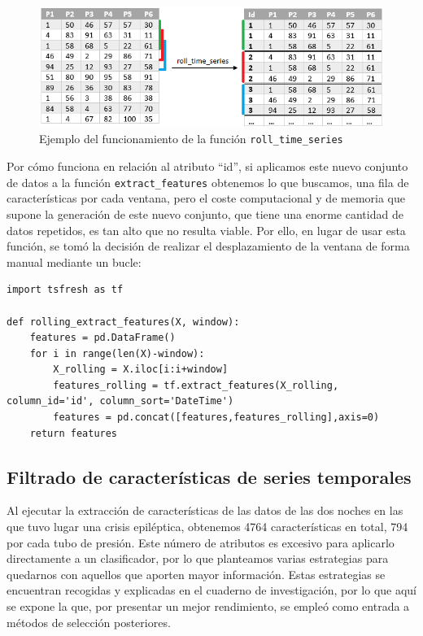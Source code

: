 \begin{figure}[H]
	\centering
	\includegraphics[width=1\textwidth]{../img/rolltimeseries.png}
	\caption{Ejemplo del funcionamiento de la función \texttt{roll\_time\_series}}
	\label{fig:rolltimeseries}
\end{figure}

Por cómo funciona en relación al atributo ``id'', si aplicamos este nuevo conjunto de datos a la función \texttt{extract\_features} obtenemos lo que buscamos, una fila de características por cada ventana, pero el coste computacional y de memoria que supone la generación de este nuevo conjunto, que tiene una enorme cantidad de datos repetidos, es tan alto que no resulta viable. Por ello, en lugar de usar esta función, se tomó la decisión de realizar el desplazamiento de la ventana de forma manual mediante un bucle:

\begin{minipage}{0.95\linewidth} 
\begin{lstlisting}
import tsfresh as tf

def rolling_extract_features(X, window): 
	features = pd.DataFrame()
	for i in range(len(X)-window): 
		X_rolling = X.iloc[i:i+window]
		features_rolling = tf.extract_features(X_rolling, column_id='id', column_sort='DateTime')
		features = pd.concat([features,features_rolling],axis=0)
	return features
\end{lstlisting}
\end{minipage}


\subsection{Filtrado de características de series temporales}

Al ejecutar la extracción de características de las datos de las dos noches en las que tuvo lugar una crisis epiléptica, obtenemos 4764 características en total, 794 por cada tubo de presión. Este número de atributos es excesivo para aplicarlo directamente a un clasificador, por lo que planteamos varias estrategias para quedarnos con aquellos que aporten mayor información. Estas estrategias se encuentran recogidas y explicadas en el cuaderno de investigación, por lo que aquí se expone la que, por presentar un mejor rendimiento, se empleó como entrada a métodos de selección posteriores. 

